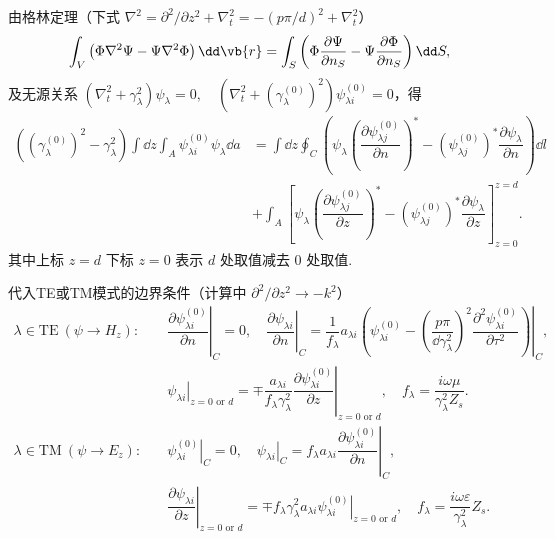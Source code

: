由格林定理（下式 \(\nabla^2 = \partial^2/\partial z^2 + \nabla_t^2 = -(p\pi/d)^2 + \nabla_t^2\)）
\begin{align*}
	\int_V \left( \Phi \nabla^2 \Psi - \Psi \nabla^2 \Phi \right) \dd \vb{r} = \int_S \left( \Phi \dfrac{\partial \Psi}{\partial n_S} - \Psi \dfrac{\partial \Phi}{\partial n_S} \right) \dd S,
\end{align*}
及无源关系 \((\nabla_t^2 + \gamma_{\lambda}^2) \psi_{\lambda} = 0,\quad(\nabla_t^2 + (\gamma_{\lambda}^{(0)})^2) \psi_{\lambda i}^{(0)} = 0\)，得
\begin{align*}
	\left( (\gamma_{\lambda}^{(0)})^2 - \gamma_{\lambda}^2 \right) \int \dd z \int_A \psi_{\lambda i}^{(0)} \psi_{\lambda} \dd a &= \int \dd z \oint_C \left( \psi_{\lambda} \left( \dfrac{\partial \psi_{\lambda j}^{(0)}}{\partial n} \right)^* - \left( \psi_{\lambda j}^{(0)} \right)^* \dfrac{\partial \psi_{\lambda}}{\partial n} \right) \dd l \\\qquad&+ \int_A \left[ \psi_{\lambda} \left( \dfrac{\partial \psi_{\lambda j}^{(0)}}{\partial z} \right)^* - \left( \psi_{\lambda j}^{(0)} \right)^* \dfrac{\partial \psi_{\lambda}}{\partial z} \right]_{z=0}^{z=d}.
\end{align*}
其中上标 \(z=d\) 下标 \(z=0\) 表示 \(d\) 处取值减去 \(0\) 处取值.

代入TE或TM模式的边界条件（计算中 \(\partial^2/\partial z^2 \to -k^2\)）
\begin{align*}
	\lambda \in \text{TE}\ (\psi \to H_z):\quad& \left. \dfrac{\partial \psi_{\lambda i}^{(0)}}{\partial n} \right|_C = 0, \quad\left. \dfrac{\partial \psi_{\lambda i}}{\partial n} \right|_C = \left. \dfrac{1}{f_{\lambda}} a_{\lambda i} \left( \psi_{\lambda i}^{(0)} - \left( \dfrac{p\pi}{\dd \gamma_{\lambda}^2} \right)^2 \dfrac{\partial^2 \psi_{\lambda i}^{(0)}}{\partial \tau^2} \right) \right|_C, \\
	&\left. \psi_{\lambda i} \right|_{z=0 \text{ or } d} = \left. \mp \dfrac{a_{\lambda i}}{f_{\lambda} \gamma_{\lambda}^2} \dfrac{\partial \psi_{\lambda i}^{(0)}}{\partial z} \right|_{z=0 \text{ or } d}, \quad f_{\lambda} = \dfrac{i\omega\mu}{\gamma_{\lambda}^2 Z_s}.\\
	\lambda \in \text{TM}\ (\psi \to E_z):\quad& \left. \psi_{\lambda i}^{(0)} \right|_C = 0, \quad\left. \psi_{\lambda i} \right|_C = \left. f_{\lambda} a_{\lambda i} \dfrac{\partial \psi_{\lambda i}^{(0)}}{\partial n} \right|_C, \\
	&\left. \dfrac{\partial \psi_{\lambda i}}{\partial z} \right|_{z=0 \text{ or } d} = \left. \mp f_{\lambda} \gamma_{\lambda}^2 a_{\lambda i} \psi_{\lambda i}^{(0)} \right|_{z=0 \text{ or } d}, \quad f_{\lambda} = \dfrac{i\omega\varepsilon}{\gamma_{\lambda}^2} Z_s.
\end{align*}


